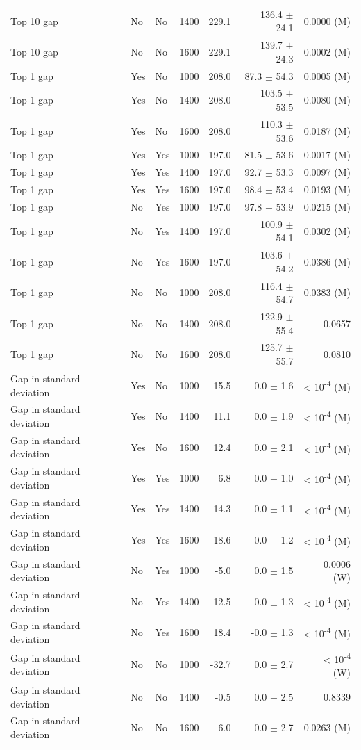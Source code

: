 \documentclass[9pt,twoside,lineno]{pnas-new}
\begin{document}
\begin{table}
\begin{tabular}[t]{llllrrr}
Top 10 gap & No & No & 1400 & 229.1 & 136.4 $\pm$ 24.1 & 0.0000 (M)\\
Top 10 gap & No & No & 1600 & 229.1 & 139.7 $\pm$ 24.3 & 0.0002 (M)\\
\addlinespace
Top 1 gap & Yes & No & 1000 & 208.0 & 87.3 $\pm$ 54.3 & 0.0005 (M)\\
Top 1 gap & Yes & No & 1400 & 208.0 & 103.5 $\pm$ 53.5 & 0.0080 (M)\\
Top 1 gap & Yes & No & 1600 & 208.0 & 110.3 $\pm$ 53.6 & 0.0187 (M)\\
Top 1 gap & Yes & Yes & 1000 & 197.0 & 81.5 $\pm$ 53.6 & 0.0017 (M)\\
Top 1 gap & Yes & Yes & 1400 & 197.0 & 92.7 $\pm$ 53.3 & 0.0097 (M)\\
Top 1 gap & Yes & Yes & 1600 & 197.0 & 98.4 $\pm$ 53.4 & 0.0193 (M)\\
Top 1 gap & No & Yes & 1000 & 197.0 & 97.8 $\pm$ 53.9 & 0.0215 (M)\\
Top 1 gap & No & Yes & 1400 & 197.0 & 100.9 $\pm$ 54.1 & 0.0302 (M)\\
Top 1 gap & No & Yes & 1600 & 197.0 & 103.6 $\pm$ 54.2 & 0.0386 (M)\\
Top 1 gap & No & No & 1000 & 208.0 & 116.4 $\pm$ 54.7 & 0.0383 (M)\\
Top 1 gap & No & No & 1400 & 208.0 & 122.9 $\pm$ 55.4 & 0.0657\\
Top 1 gap & No & No & 1600 & 208.0 & 125.7 $\pm$ 55.7 & 0.0810\\
\addlinespace
Gap in standard deviation & Yes & No & 1000 & 15.5 & 0.0 $\pm$ 1.6 & < 10\textsuperscript{-4} (M)\\
Gap in standard deviation & Yes & No & 1400 & 11.1 & 0.0 $\pm$ 1.9 & < 10\textsuperscript{-4} (M)\\
Gap in standard deviation & Yes & No & 1600 & 12.4 & 0.0 $\pm$ 2.1 & < 10\textsuperscript{-4} (M)\\
Gap in standard deviation & Yes & Yes & 1000 & 6.8 & 0.0 $\pm$ 1.0 & < 10\textsuperscript{-4} (M)\\
Gap in standard deviation & Yes & Yes & 1400 & 14.3 & 0.0 $\pm$ 1.1 & < 10\textsuperscript{-4} (M)\\
Gap in standard deviation & Yes & Yes & 1600 & 18.6 & 0.0 $\pm$ 1.2 & < 10\textsuperscript{-4} (M)\\
Gap in standard deviation & No & Yes & 1000 & -5.0 & 0.0 $\pm$ 1.5 & 0.0006 (W)\\
Gap in standard deviation & No & Yes & 1400 & 12.5 & 0.0 $\pm$ 1.3 & < 10\textsuperscript{-4} (M)\\
Gap in standard deviation & No & Yes & 1600 & 18.4 & -0.0 $\pm$ 1.3 & < 10\textsuperscript{-4} (M)\\
Gap in standard deviation & No & No & 1000 & -32.7 & 0.0 $\pm$ 2.7 & < 10\textsuperscript{-4} (W)\\
Gap in standard deviation & No & No & 1400 & -0.5 & 0.0 $\pm$ 2.5 & 0.8339\\
Gap in standard deviation & No & No & 1600 & 6.0 & 0.0 $\pm$ 2.7 & 0.0263 (M)\\
\bottomrule
\end{tabular}
\end{table}
\end{document}

